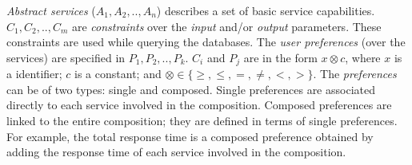 \begin{defi}
\textit{Abstract services} ($A_{1}, A_{2}, .., A_{n}$) describes a set of basic service capabilities.
%
$C_{1}, C_{2}, .., C_{m}$ are \textit{constraints} over the \textit{input} and/or \textit{output} parameters. These constraints are used while querying the databases. 
The \textit{user preferences} (over the services) are specified in $P_{1}, P_{2}, .., P_{k}$.  
%
$C_{i}$ and $P_{j}$ are in the form $x \otimes c$, where $x$ is a identifier; $c$ is a constant; and
$\otimes \in\lbrace \geq, \leq, =, \neq, <, >\rbrace$.
%
The \textit{preferences} can be of two types: single and composed. Single preferences are associated directly to each service involved in the composition. Composed preferences are linked to the entire composition; they are defined in terms of single preferences. For example, the total response time is a composed preference obtained by adding the response time of each service involved in the composition. 

\end{defi}


